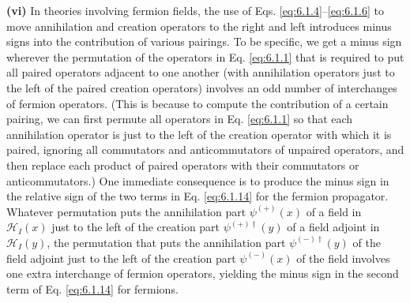 \noindent\textbf{(vi)} In theories involving fermion fields, the use of Eqs.
\eqref{eq:6.1.4}--\eqref{eq:6.1.6} to move annihilation and creation operators to the right and
left introduces minus signs into the contribution of various pairings. To be
specific, we get a minus sign wherever the permutation of the operators in Eq.
\eqref{eq:6.1.1} that is required to put all paired operators adjacent to one another
(with annihilation operators just to the left of the paired creation operators)
involves an odd number of interchanges of fermion operators. (This is because
to compute the contribution of a certain pairing, we can first permute all
operators in Eq. \eqref{eq:6.1.1} so that each annihilation operator is just to the left
of the creation operator with which it is paired, ignoring all commutators and
anticommutators of unpaired operators, and then replace each product of paired
operators with their commutators or anticommutators.) One immediate consequence
is to produce the minus sign in the relative sign of the two terms in Eq.
\eqref{eq:6.1.14} for the fermion propagator. Whatever permutation puts the annihilation
part $\psi^{(+)}(x)$ of a field in $\mathcal H_I(x)$ just to the left of the
creation part $\psi^{(+)\dagger}(y)$ of a field adjoint in $\mathcal H_I(y)$,
the permutation that puts the annihilation part $\psi^{(-)\dagger}(y)$ of the
field adjoint just to the left of the creation part $\psi^{(-)}(x)$ of the field
involves one extra interchange of fermion operators, yielding the minus sign in
the second term of Eq. \eqref{eq:6.1.14} for fermions.

